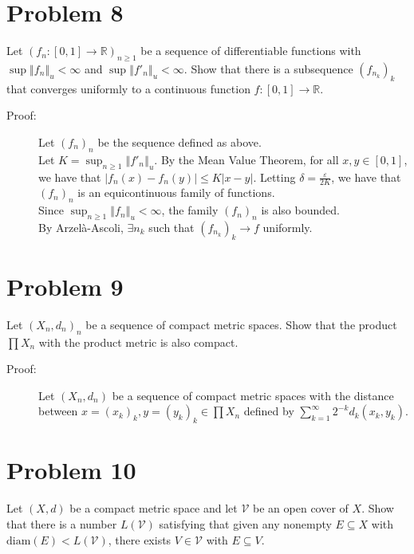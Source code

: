 \documentclass[10pt]{extarticle}
\newcommand{\R}{\mathbb{R}}
\newcommand{\norm}[1]{\left\Vert #1\right\Vert}
\begin{document}
  \section{Problem 8}%
  Let $(f_n: [0,1]\rightarrow \R)_{n\geq 1}$ be a sequence of differentiable functions with $\sup\norm{f_n}_u < \infty$ and $\sup\norm{f'_n}_u < \infty$. Show that there is a subsequence $\left(f_{n_k}\right)_k$ that converges uniformly to a continuous function $f: [0,1]\rightarrow \R$.
  \begin{description}
    \item[Proof:] Let $(f_n)_n$ be the sequence defined as above.\\

      Let $K = \sup_{n\geq 1}\norm{f'_n}_u$. By the Mean Value Theorem, for all $x,y\in [0,1]$, we have that $|f_n(x)-f_n(y)| \leq K|x-y|$. Letting $\delta = \frac{\varepsilon}{2K}$, we have that $(f_n)_n$ is an equicontinuous family of functions.\\

      Since $\sup_{n\geq 1}\norm{f_n}_u < \infty$, the family $(f_n)_n$ is also bounded.\\

      By Arzelà-Ascoli, $\exists n_k$ such that $\left(f_{n_k}\right)_k \rightarrow f$ uniformly.
  \end{description}
  \section{Problem 9}%
  Let $(X_n,d_n)_n$ be a sequence of compact metric spaces. Show that the product $\prod X_n$ with the product metric is also compact.
  \begin{description}
    \item[Proof:] Let $(X_n,d_n)$ be a sequence of compact metric spaces with the distance between $x=(x_k)_k,y=(y_k)_k\in \prod X_n$ defined by $\sum_{k=1}^{\infty}2^{-k}d_{k}(x_k,y_k)$.
  \end{description}
  \section{Problem 10}%
  Let $(X,d)$ be a compact metric space and let $\mathcal{V}$ be an open cover of $X$. Show that there is a number $L(\mathcal{V})$ satisfying that given any nonempty $E\subseteq X$ with $\text{diam}(E) < L(\mathcal{V})$, there exists $V\in \mathcal{V}$ with $E\subseteq V$.
\end{document}
